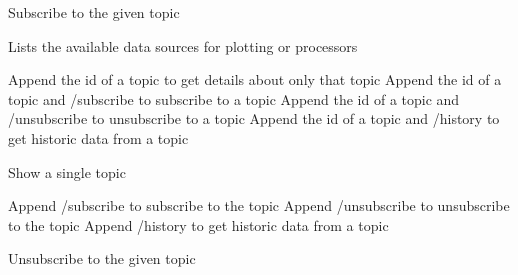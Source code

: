 \documentclass[letterpaper,10pt,english]{sphinxmanual}
\begin{document}

\begin{fulllineitems}
\label{\detokenize{src:src.views.subscribe}}
Subscribe to the given topic

\end{fulllineitems}


\begin{fulllineitems}
\label{\detokenize{src:src.views.topics}}
Lists the available data sources for plotting or processors

Append the id of a topic to get details about only that topic
Append the id of a topic and /subscribe to subscribe to a topic
Append the id of a topic and /unsubscribe to unsubscribe to a topic
Append the id of a topic and /history to get historic data from a topic

\end{fulllineitems}


\begin{fulllineitems}
\label{\detokenize{src:src.views.topics_detail}}
Show a single topic

Append /subscribe to subscribe to the topic
Append /unsubscribe to unsubscribe to the topic
Append /history to get historic data from a topic

\end{fulllineitems}


\begin{fulllineitems}
\label{\detokenize{src:src.views.unsubscribe}}
Unsubscribe to the given topic

\end{fulllineitems}
\end{document}
